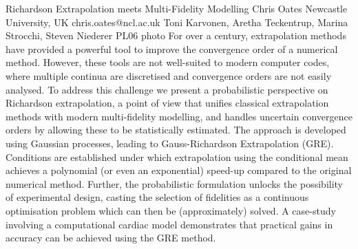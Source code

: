 \documentclass[12pt,a4paper,figuresright]{book}
\begin{document}
\clearpage

\begin{talk}
	{Richardson Extrapolation meets Multi-Fidelity Modelling}%
	{Chris Oates}%
	{Newcastle University, UK}%
	{chris.oates@ncl.ac.uk}%
	{Toni Karvonen, Aretha Teckentrup, Marina Strocchi, Steven Niederer}%
	{}%
	{}%
	{PL06}%
	{photo}%
	For over a century, extrapolation methods have provided a powerful tool to improve the convergence order of a numerical method. However, these tools are not well-suited to modern computer codes, where multiple continua are discretised and convergence orders are not easily analysed. To address this challenge we present a probabilistic perspective on Richardson extrapolation, a point of view that unifies classical extrapolation methods with modern multi-fidelity modelling, and handles uncertain convergence orders by allowing these to be statistically estimated. The approach is developed using Gaussian processes, leading to Gauss-Richardson Extrapolation (GRE). Conditions are established under which extrapolation using the conditional mean achieves a polynomial (or even an exponential) speed-up compared to the original numerical method. Further, the probabilistic formulation unlocks the possibility of experimental design, casting the selection of fidelities as a continuous optimisation problem which can then be (approximately) solved. A case-study involving a computational cardiac model demonstrates that practical gains in accuracy can be achieved using the GRE method.
\end{talk}

\clearpage
\end{document}
